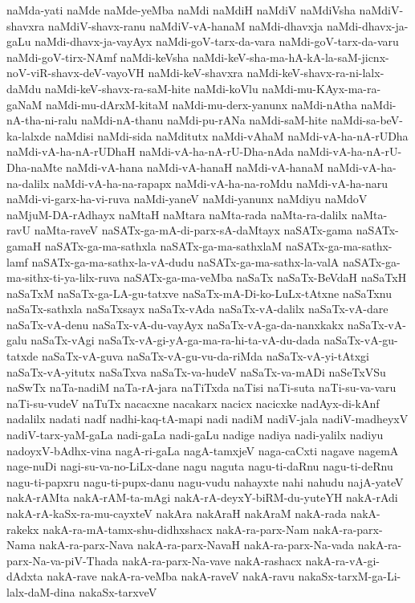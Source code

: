 {naMda-yati
naMde
naMde-yeMba
naMdi
naMdiH
naMdiV
naMdiVsha
naMdiV-shavxra
naMdiV-shavx-ranu
naMdiV-vA-hanaM
naMdi-dhavxja
naMdi-dhavx-ja-gaLu
naMdi-dhavx-ja-vayAyx
naMdi-goV-tarx-da-vara
naMdi-goV-tarx-da-varu
naMdi-goV-tirx-NAmf
naMdi-keVsha
naMdi-keV-sha-ma-hA-kA-la-saM-jicnx-noV-viR-shavx-deV-vayoVH
naMdi-keV-shavxra
naMdi-keV-shavx-ra-ni-lalx-daMdu
naMdi-keV-shavx-ra-saM-hite
naMdi-koVlu
naMdi-mu-KAyx-ma-ra-gaNaM
naMdi-mu-dArxM-kitaM
naMdi-mu-derx-yanunx
naMdi-nAtha
naMdi-nA-tha-ni-ralu
naMdi-nA-thanu
naMdi-pu-rANa
naMdi-saM-hite
naMdi-sa-beV-ka-lalxde
naMdisi
naMdi-sida
naMditutx
naMdi-vAhaM
naMdi-vA-ha-nA-rUDha
naMdi-vA-ha-nA-rUDhaH
naMdi-vA-ha-nA-rU-Dha-nAda
naMdi-vA-ha-nA-rU-Dha-naMte
naMdi-vA-hana
naMdi-vA-hanaH
naMdi-vA-hanaM
naMdi-vA-ha-na-dalilx
naMdi-vA-ha-na-rapapx
naMdi-vA-ha-na-roMdu
naMdi-vA-ha-naru
naMdi-vi-garx-ha-vi-ruva
naMdi-yaneV
naMdi-yanunx
naMdiyu
naMdoV
naMjuM-DA-rAdhayx
naMtaH
naMtara
naMta-rada
naMta-ra-dalilx
naMta-ravU
naMta-raveV
naSATx-ga-mA-di-parx-sA-daMtayx
naSATx-gama
naSATx-gamaH
naSATx-ga-ma-sathxla
naSATx-ga-ma-sathxlaM
naSATx-ga-ma-sathx-lamf
naSATx-ga-ma-sathx-la-vA-dudu
naSATx-ga-ma-sathx-la-valA
naSATx-ga-ma-sithx-ti-ya-lilx-ruva
naSATx-ga-ma-veMba
naSaTx
naSaTx-BeVdaH
naSaTxH
naSaTxM
naSaTx-ga-LA-gu-tatxve
naSaTx-mA-Di-ko-LuLx-tAtxne
naSaTxnu
naSaTx-sathxla
naSaTxsayx
naSaTx-vAda
naSaTx-vA-dalilx
naSaTx-vA-dare
naSaTx-vA-denu
naSaTx-vA-du-vayAyx
naSaTx-vA-ga-da-nanxkakx
naSaTx-vA-galu
naSaTx-vAgi
naSaTx-vA-gi-yA-ga-ma-ra-hi-ta-vA-du-dada
naSaTx-vA-gu-tatxde
naSaTx-vA-guva
naSaTx-vA-gu-vu-da-riMda
naSaTx-vA-yi-tAtxgi
naSaTx-vA-yitutx
naSaTxva
naSaTx-va-hudeV
naSaTx-va-mADi
naSeTxVSu
naSwTx
naTa-nadiM
naTa-rA-jara
naTiTxda
naTisi
naTi-suta
naTi-su-va-varu
naTi-su-vudeV
naTuTx
nacacxne
nacakarx
nacicx
nacicxke
nadAyx-di-kAnf
nadalilx
nadati
nadf
nadhi-kaq-tA-mapi
nadi
nadiM
nadiV-jala
nadiV-madheyxV
nadiV-tarx-yaM-gaLa
nadi-gaLa
nadi-gaLu
nadige
nadiya
nadi-yalilx
nadiyu
nadoyxV-bAdhx-vina
nagA-ri-gaLa
nagA-tamxjeV
naga-caCxti
nagave
nagemA
nage-nuDi
nagi-su-va-no-LiLx-dane
nagu
naguta
nagu-ti-daRnu
nagu-ti-deRnu
nagu-ti-papxru
nagu-ti-pupx-danu
nagu-vudu
nahayxte
nahi
nahudu
najA-yateV
nakA-rAMta
nakA-rAM-ta-mAgi
nakA-rA-deyxY-biRM-du-yuteYH
nakA-rAdi
nakA-rA-kaSx-ra-mu-cayxteV
nakAra
nakAraH
nakAraM
nakA-rada
nakA-rakekx
nakA-ra-mA-tamx-shu-didhxshacx
nakA-ra-parx-Nam
nakA-ra-parx-Nama
nakA-ra-parx-Nava
nakA-ra-parx-NavaH
nakA-ra-parx-Na-vada
nakA-ra-parx-Na-va-piV-Thada
nakA-ra-parx-Na-vave
nakA-rashacx
nakA-ra-vA-gi-dAdxta
nakA-rave
nakA-ra-veMba
nakA-raveV
nakA-ravu
nakaSx-tarxM-ga-Li-lalx-daM-dina
nakaSx-tarxveV
}
